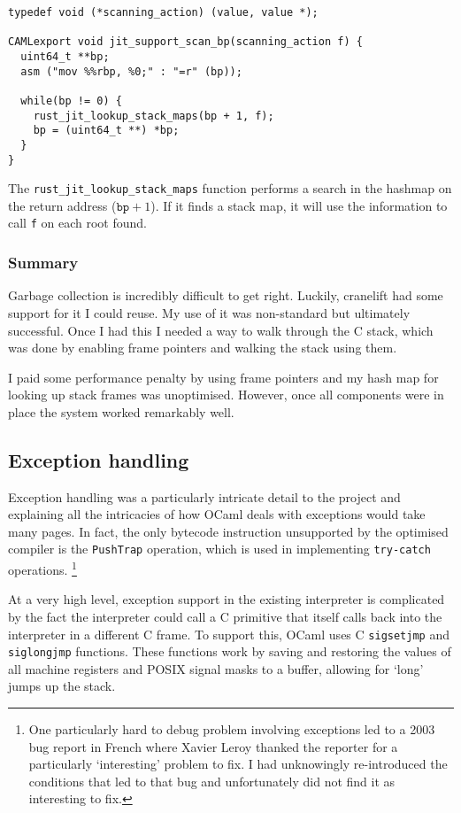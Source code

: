 \begin{verbatim}
typedef void (*scanning_action) (value, value *);

CAMLexport void jit_support_scan_bp(scanning_action f) {
  uint64_t **bp;
  asm ("mov %%rbp, %0;" : "=r" (bp));

  while(bp != 0) {
    rust_jit_lookup_stack_maps(bp + 1, f);
    bp = (uint64_t **) *bp;
  }
}
\end{verbatim}

The \texttt{rust\_jit\_lookup\_stack\_maps} function performs a search in the hashmap on the return
address
($\texttt{bp} + 1$). If it finds a stack map, it will use the information to call \texttt{f} on
each root found.

\subsubsection{Summary}

Garbage collection is incredibly difficult to get right. Luckily, cranelift had some support for it
I could reuse. My use of it was non-standard but ultimately successful. Once I had this I needed a
way to walk through the C stack, which was done by enabling frame pointers and walking the stack
using them.

I paid some performance penalty by using frame pointers and my hash map for looking up stack frames
was unoptimised. However, once all components were in place the system worked remarkably well.

\subsection{Exception handling} \label{exception-handling}

Exception handling was a particularly intricate detail to the project and explaining all the
intricacies of how OCaml deals with exceptions would take many pages. In fact, the only bytecode
instruction unsupported by the optimised compiler is the \texttt{PushTrap} operation, which is used
in implementing \texttt{try-catch} operations.
\footnote{One particularly hard to debug problem involving exceptions led to a 2003 bug report in
      French where Xavier Leroy thanked the reporter for a particularly `interesting' problem to
      fix. I
      had unknowingly re-introduced the conditions that led to that bug and unfortunately did not
      find it
      as interesting to fix.}

At a very high level, exception support in the existing interpreter is complicated by the fact the
interpreter could call a C primitive that itself calls back into the interpreter in a different C
frame. To support this, OCaml uses C \texttt{sigsetjmp} and \texttt{siglongjmp} functions. These
functions work by saving and restoring the values of all machine registers and POSIX signal masks
to a buffer, allowing for `long' jumps up the stack.

